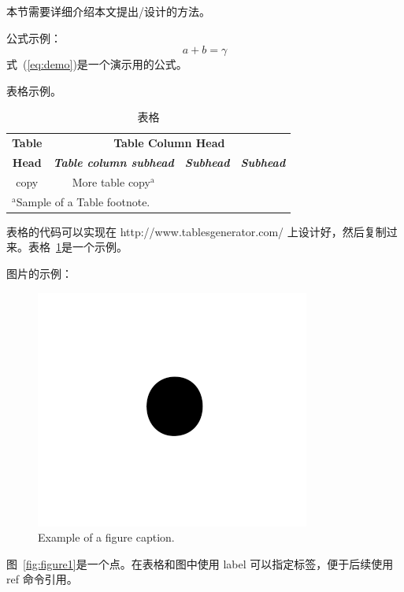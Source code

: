 \documentclass[conference]{IEEEtran}
\begin{document}
本节需要详细介绍本文提出/设计的方法。

公式示例：
\begin{equation}
a+b=\gamma\label{eq:demo}
\end{equation}
式~(\ref{eq:demo})是一个演示用的公式。

表格示例。
\begin{table}[htbp]
\caption{表格}
\begin{center}
\begin{tabular}{|c|c|c|c|}
\hline
\textbf{Table}&\multicolumn{3}{|c|}{\textbf{Table Column Head}} \\
\cline{2-4} 
\textbf{Head} & \textbf{\textit{Table column subhead}}& \textbf{\textit{Subhead}}& \textbf{\textit{Subhead}} \\
\hline
copy& More table copy$^{\mathrm{a}}$& &  \\
\hline
\multicolumn{4}{l}{$^{\mathrm{a}}$Sample of a Table footnote.}
\end{tabular}
\label{tbl:test}
\end{center}
\end{table}
表格的代码可以实现在 http://www.tablesgenerator.com/ 上设计好，然后复制过来。表格~\ref{tbl:test}是一个示例。

图片的示例：
\begin{figure}[htbp]
\centerline{\includegraphics{images/fig1.png}}
\caption{Example of a figure caption.}
\label{fig:figure-1}
\end{figure}
图~\ref{fig:figure1}是一个点。在表格和图中使用 label 可以指定标签，便于后续使用 ref 命令引用。

\end{document}
